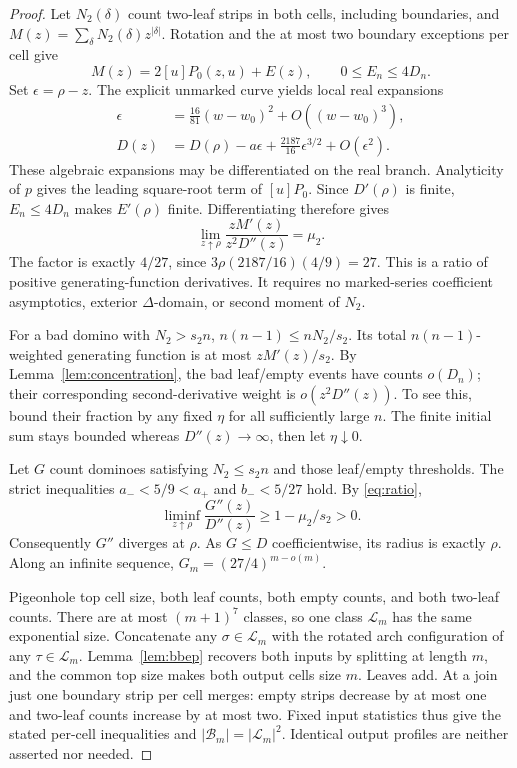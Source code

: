 \documentclass[11pt]{amsart}
\numberwithin{equation}{section}
\theoremstyle{remark}\newtheorem{remark}[theorem]{Remark}
\begin{document}
\begin{proof}
Let $N_2(\delta)$ count two-leaf strips in both cells, including boundaries, and $M(z)=\sum_\delta N_2(\delta)z^{|\delta|}$. Rotation and the at most two boundary exceptions per cell give
\[
 M(z)=2[u]P_0(z,u)+E(z),\qquad 0\leq E_n\leq4D_n.
\]
Set $\epsilon=\rho-z$. The explicit unmarked curve yields local real expansions
\begin{align*}
 \epsilon&=\frac{16}{81}(w-w_0)^2+O((w-w_0)^3),\\
 D(z)&=D(\rho)-a\epsilon+\frac{2187}{16}\epsilon^{3/2}
                                     +O(\epsilon^2).
\end{align*}
These algebraic expansions may be differentiated on the real branch. Analyticity of $p$ gives the leading square-root term of $[u]P_0$. Since $D'(\rho)$ is finite, $E_n\leq4D_n$ makes $E'(\rho)$ finite. Differentiating therefore gives
\begin{equation}\label{eq:ratio}
 \lim_{z\uparrow\rho}\frac{zM'(z)}{z^2D''(z)}=\mu_2.
\end{equation}
The factor is exactly $4/27$, since $3\rho(2187/16)(4/9)=27$. This is a ratio of positive generating-function derivatives. It requires no marked-series coefficient asymptotics, exterior $\Delta$-domain, or second moment of $N_2$.

For a bad domino with $N_2>s_2n$, $n(n-1)\leq nN_2/s_2$. Its total $n(n-1)$-weighted generating function is at most $zM'(z)/s_2$. By Lemma~\ref{lem:concentration}, the bad leaf/empty events have counts $o(D_n)$; their corresponding second-derivative weight is $o(z^2D''(z))$. To see this, bound their fraction by any fixed $\eta$ for all sufficiently large $n$. The finite initial sum stays bounded whereas $D''(z)\to\infty$, then let $\eta\downarrow0$.

Let $G$ count dominoes satisfying $N_2\leq s_2n$ and those leaf/empty thresholds. The strict inequalities $a_-<5/9<a_+$ and $b_-<5/27$ hold. By \eqref{eq:ratio},
\[
 \liminf_{z\uparrow\rho}\frac{G''(z)}{D''(z)}
       \geq1-\mu_2/s_2>0.
\]
Consequently $G''$ diverges at $\rho$. As $G\leq D$ coefficientwise, its radius is exactly $\rho$. Along an infinite sequence, $G_m=(27/4)^{m-o(m)}$.

Pigeonhole top cell size, both leaf counts, both empty counts, and both two-leaf counts. There are at most $(m+1)^7$ classes, so one class $\mathcal L_m$ has the same exponential size. Concatenate any $\sigma\in\mathcal L_m$ with the rotated arch configuration of any $\tau\in\mathcal L_m$. Lemma~\ref{lem:bbep} recovers both inputs by splitting at length $m$, and the common top size makes both output cells size $m$. Leaves add. At a join just one boundary strip per cell merges: empty strips decrease by at most one and two-leaf counts increase by at most two. Fixed input statistics thus give the stated per-cell inequalities and $|\mathcal B_m|=|\mathcal L_m|^2$. Identical output profiles are neither asserted nor needed.
\end{proof}
\end{document}
